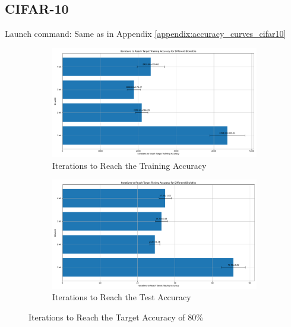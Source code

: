    \subsection{CIFAR-10}
    \label{appendix:iterations_cifar10}
        Launch command: Same as in Appendix \ref{appendix:accuracy_curves_cifar10}
        \begin{figure}[H]
            \centering
            \begin{subfigure}[H]{0.48\textwidth}
                \centering
                \includegraphics[width=\textwidth]{../standard/CIFAR10/plots/cifar10_train_iters.pdf}
                \caption{Iterations to Reach the Training Accuracy}
            \end{subfigure}
            \hfill
            \begin{subfigure}[H]{0.48\textwidth}
                \centering
                \includegraphics[width=\textwidth]{../standard/CIFAR10/plots/cifar10_test_iters.pdf}
                \caption{Iterations to Reach the Test Accuracy}
            \end{subfigure}
            \caption{Iterations to Reach the Target Accuracy of 80\%}
        \end{figure}



